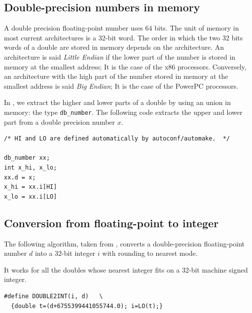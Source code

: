 \subsection{Double-precision numbers in memory\label{section:memory}}

A double precision floating-point number uses $64$ bits. The unit of
memory in most current architectures is a 32-bit word. The order in
which the two $32$ bits words of a double are stored in memory depends
on the architecture. An architecture is said \emph{Little Endian} if
the lower part of the number is stored in memory at the smallest
address; It is the case of the x86 processors. Conversely, an
architecture with the high part of the number stored in memory at the
smallest address is said \emph{Big Endian}; It is the case of the
PowerPC processors.

In \crlibm, we extract the higher and lower parts of a double by using
an union in memory: the type \texttt{db\_number}. The following code
extracts the upper and lower part from a double precision number $x$.

\begin{lstlisting}[label={chap0:lst:endian},
  caption={Extract upper and lower part of a double precision number $x$},firstnumber=1]
  /* HI and LO are defined automatically by autoconf/automake.  */

db_number xx;
int x_hi, x_lo;
xx.d = x;
x_hi = xx.i[HI]
x_lo = xx.i[LO]
\end{lstlisting}




\subsection{Conversion from floating-point to integer \label{sec:double2int}}

\begin{theorem}
  The following algorithm, taken from \cite{AMDoptim2001}, converts a
  double-precision floating-point number $d$ into a 32-bit
  integer $i$ with rounding to nearest mode.

  It works for all the doubles whose nearest integer fits on a 32-bit machine signed integer.

\begin{lstlisting}[label={chap0:lst:conversion2},caption={Conversion from FP to int},firstnumber=1]
#define DOUBLE2INT(i, d)   \
  {double t=(d+6755399441055744.0); i=LO(t);}
\end{lstlisting}
\end{theorem}

